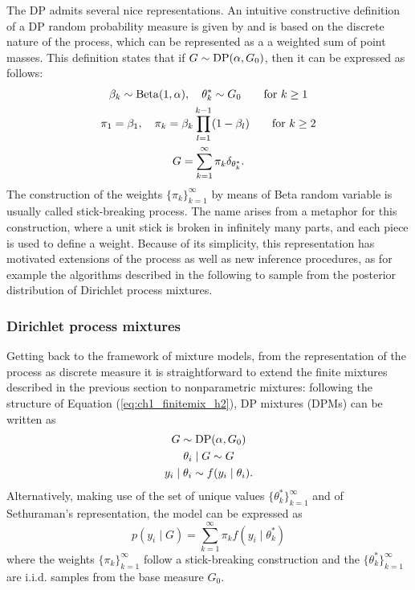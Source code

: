 The DP admits several nice representations. An intuitive constructive definition of a DP random probability measure is given by \citet{sethuraman1994} and is based on the discrete nature of the process, which can be represented as a a weighted sum of point masses. This definition states that if  $G\sim \mathrm{DP}(\alpha, G_0)$, then it can be expressed as follows:
\begin{gather} \label{eq:ch1_stickbreaking}
\beta_k \sim \Beta(1,\alpha), \quad \theta^*_k \sim G_0 \qquad \text{for } k\geq 1 \nonumber \\
\pi_1 = \beta_1, \quad \pi_k = \beta_k \prod_{l = 1}^{k-1} (1-\beta_l) \qquad \text{for } k\geq 2\\
G = \sum_{k=1}^{\infty} \pi_k \delta_{\theta^*_k}. \nonumber
\end{gather}
The construction of the weights $\{\pi_k\}_{k=1}^{\infty}$ by means of Beta random variable is usually called stick-breaking process. The name arises from a metaphor for this construction, where a unit stick is broken in infinitely many parts, and each piece is used to define a weight.
Because of its simplicity, this representation has motivated extensions of the process as well as new inference procedures, as for example the algorithms described in the following to sample from the posterior distribution of Dirichlet process mixtures.


\subsubsection*{Dirichlet process mixtures}
Getting back to the framework of mixture models, from the representation of the process as discrete measure it is straightforward to extend the finite mixtures described in the previous section to nonparametric mixtures: following the structure of Equation (\ref{eq:ch1_finitemix_h2}), DP mixtures (DPMs) can be written as
\begin{equation*}
\begin{gathered}
G \sim \mathrm{DP}(\alpha,G_0)\\
\theta_i \mid G \sim G \\
y_i \mid \theta_i \sim f(y_i\mid\theta_i).
\end{gathered}
\end{equation*}
Alternatively, making use of the set of unique values $\{\theta^*_k\}_{k=1}^{\infty}$ and of Sethuraman's representation, the model can be expressed as
\begin{equation}
p(y_i\mid G) = \sum_{k=1}^{\infty} \pi_k f(y_i\mid\theta^*_k)
\label{eq:ch1_DPM}
\end{equation}
where the weights $\{\pi_k\}_{k=1}^{\infty}$ follow a stick-breaking construction and the $\{\theta^*_k\}_{k=1}^{\infty}$ are i.i.d. samples from the base measure $G_0$.

